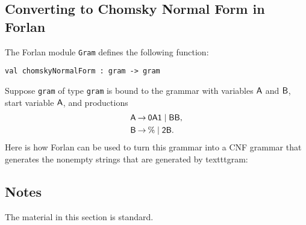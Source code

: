 \subsection*{Converting to Chomsky Normal Form in Forlan}

The Forlan module \texttt{Gram} defines the following function:
\begin{verbatim}
val chomskyNormalForm : gram -> gram
\end{verbatim}
%

Suppose \texttt{gram} of type \texttt{gram} is bound to the grammar with
variables $\mathsf{A}$ and $\mathsf{B}$, start variable $\mathsf{A}$, and productions
\begin{align*}
  \mathsf{A} &\mathbin{\to} \mathsf{0A1} \mid \mathsf{BB} , \\
  \mathsf{B} &\mathbin{\to} \% \mid \mathsf{2B} .
\end{align*}
Here is how Forlan can be used to turn this grammar into a CNF
grammar that generates the nonempty strings that are generated by
texttt{gram}:


\subsection{Notes}

The material in this section is standard.

